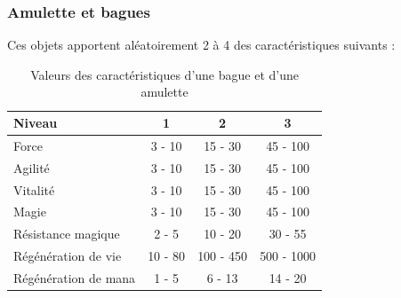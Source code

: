 \documentclass[11pt, a4paper, oneside]{report}
\begin{document}
\subsubsection{Amulette et bagues}
Ces objets apportent aléatoirement 2 à 4 des caractéristiques suivants :
\begin{table}[ht]
\begin{center}
\begin{tabular}{| l | c | c | c |}
  \hline      
  Niveau 				& 1    & 2 & 3\\ \hline \hline                 
  Force 				& 3 - 10 & 15 - 30 & 45 - 100\\ \hline
  Agilité 				& 3 - 10 & 15 - 30 & 45 - 100\\ \hline
  Vitalité 				& 3 - 10 & 15 - 30 & 45 - 100\\ \hline
  Magie 				& 3 - 10 & 15 - 30 & 45 - 100\\ \hline
  Résistance magique 	& 2 - 5  & 10 - 20 & 30 - 55\\ \hline
  Régénération de vie 	& 10 - 80  & 100 - 450 & 500 - 1000\\ \hline
  Régénération de mana 	& 1 - 5  & 6 - 13 & 14 - 20\\ \hline
\end{tabular}
\caption{Valeurs des caractéristiques d'une bague et d'une amulette}
\end{center}
\end{table}
\end{document}
